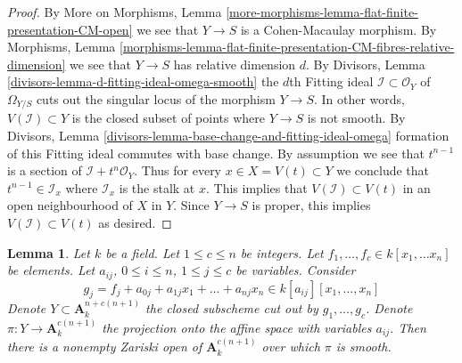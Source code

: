 \documentclass{stacks-project}
\theoremstyle{plain}
\newtheorem{lemma}[subsection]{Lemma}
\theoremstyle{definition}
\theoremstyle{remark}
\numberwithin{equation}{subsection}
\begin{document}
\begin{proof}
By More on Morphisms, Lemma
\ref{more-morphisms-lemma-flat-finite-presentation-CM-open}
we see that $Y \to S$ is a Cohen-Macaulay morphism.
By Morphisms, Lemma
\ref{morphisms-lemma-flat-finite-presentation-CM-fibres-relative-dimension}
we see that $Y \to S$ has relative dimension $d$.
By Divisors, Lemma \ref{divisors-lemma-d-fitting-ideal-omega-smooth}
the $d$th Fitting ideal $\mathcal{I} \subset \mathcal{O}_Y$
of $\Omega_{Y/S}$ cuts out the singular locus of the morphism $Y \to S$.
In other words, $V(\mathcal{I}) \subset Y$ is the closed subset
of points where $Y \to S$ is not smooth.
By Divisors, Lemma \ref{divisors-lemma-base-change-and-fitting-ideal-omega}
formation of this Fitting ideal commutes with base change.
By assumption we see that $t^{n - 1}$ is a section of
$\mathcal{I} + t^n\mathcal{O}_Y$. Thus for every
$x \in X = V(t) \subset Y$ we conclude that
$t^{n - 1} \in \mathcal{I}_x$ where $\mathcal{I}_x$ is the stalk at $x$.
This implies that $V(\mathcal{I}) \subset V(t)$ in an
open neighbourhood of $X$ in $Y$. Since $Y \to S$
is proper, this implies $V(\mathcal{I}) \subset V(t)$
as desired.
\end{proof}

\begin{lemma}
\label{lemma-jouanolou-type-thing}
Let $k$ be a field. Let $1 \leq c \leq n$ be integers.
Let $f_1, \ldots, f_c \in k[x_1, \ldots x_n]$ be elements.
Let $a_{ij}$, $0 \leq i \leq n$, $1 \leq j \leq c$ be
variables. Consider
$$
g_j = f_j + a_{0j} + a_{1j}x_1 + \ldots + a_{nj}x_n \in
k[a_{ij}][x_1, \ldots, x_n]
$$
Denote $Y \subset \mathbf{A}^{n + c(n + 1)}_k$
the closed subscheme cut out by $g_1, \ldots, g_c$.
Denote $\pi : Y \to \mathbf{A}^{c(n + 1)}_k$ the projection
onto the affine space with variables $a_{ij}$.
Then there is a nonempty Zariski open 
of $\mathbf{A}^{c(n + 1)}_k$ over which $\pi$ is smooth.
\end{lemma}
\end{document}
